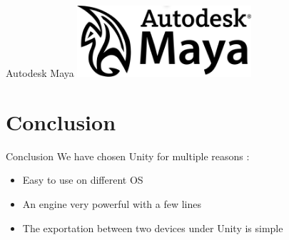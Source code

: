 \documentclass[a4paper,10pt]{beamer}
\begin{document}
			\begin{frame}{Autodesk Maya}
				\includegraphics[height=75pt]{images/Autodesk_Maya.png}
			\end{frame}
			
	\section{Conclusion}
		
		\begin{frame}{Conclusion}
			We have chosen Unity for multiple reasons :
			\begin{itemize}
				\item Easy to use on different OS
				\item An engine very powerful with a few lines
				\item The exportation between two devices under Unity is simple
			\end{itemize}			
		\end{frame}
	
\end{document}
